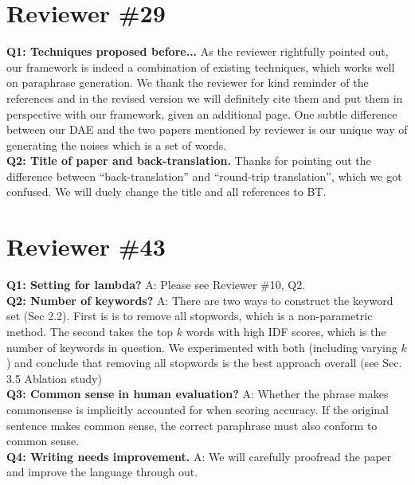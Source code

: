 \documentclass{article}
\begin{document}
\section{Reviewer \#29}
\label{sec:review3}
\textbf{Q1: Techniques proposed before...}
As the reviewer rightfully pointed out, our framework is indeed a combination
of existing techniques, which works well on paraphrase generation.
We thank the reviewer for kind reminder of the references and in the 
revised version we will definitely cite them and put them in perspective 
with our framework, given an additional page. 
One subtle difference between our DAE and the two 
papers mentioned by reviewer is our unique way of generating the noises
which is a set of words.\\
\textbf{Q2: Title of paper and back-translation.}
Thanks for pointing out the difference between
``back-translation'' and ``round-trip translation'', which we got confused.
We will duely change the title and all references to BT. 

\section{Reviewer \#43}
\label{sec:review4}
\textbf{Q1: Setting for lambda? }
A: Please see Reviewer \#10, Q2.\\
\textbf{Q2: Number of keywords? }
A: There are two ways to construct the keyword set (Sec 2.2). First is
is to remove all stopwords, which is a non-parametric method. The second
takes the top $k$ words with high IDF scores, which is the number of
keywords in question. We experimented with both (including varying $k$)
and conclude that removing all stopwords is the best approach overall
(see Sec. 3.5 Ablation study)\\ 
\textbf{Q3: Common sense in human evaluation?}
A: Whether the phrase makes commonsense is implicitly accounted for 
when scoring accuracy. If the original sentence makes common sense, 
the correct paraphrase must also conform to common sense.\\
\textbf{Q4: Writing needs improvement.}
A: We will carefully proofread the paper 
and improve the language through out.
\end{document}
